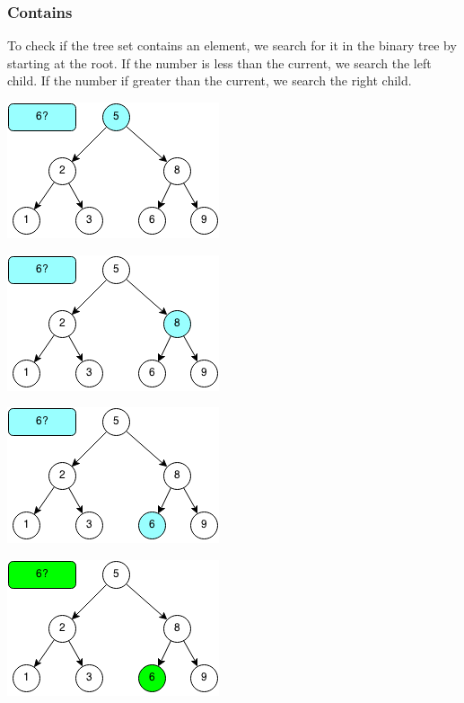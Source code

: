 \documentclass[11pt,oneside]{book}
\makeatletter
\def\maxwidth#1{\ifdim\Gin@nat@width>#1 #1\else\Gin@nat@width\fi}
\makeatother
\begin{document}
\subsubsection{Contains}

To check if the tree set contains an element, we search for it in the binary tree by starting at the root. If the number is less than the current, we search the left child. If the number if greater than the current, we search the right child.

\vspace{5px}\includegraphics[width=\maxwidth{\textwidth}]{bstcontains.png}

\vspace{5px}\includegraphics[width=\maxwidth{\textwidth}]{bstcontains2.png}

\vspace{5px}\includegraphics[width=\maxwidth{\textwidth}]{bstcontains3.png}

\vspace{5px}\includegraphics[width=\maxwidth{\textwidth}]{bstcontains4.png}
\end{document}
